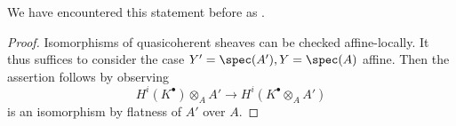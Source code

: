 We have encountered this statement before as .
\begin{proof}
    Isomorphisms of quasicoherent sheaves can be checked affine-locally. It thus suffices to consider the case $Y'=\spec(A'),Y=\spec(A)$ affine. Then the assertion follows by observing 
    $$H^{i}(K^{\bullet})\otimes_{A}A'\longrightarrow H^{i}(K^{\bullet}\otimes_{A}A')$$
    is an isomorphism by flatness of $A'$ over $A$. 
\end{proof}

